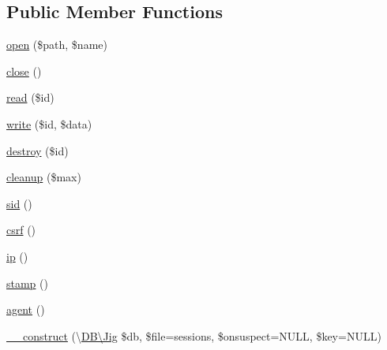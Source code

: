 \subsection*{Public Member Functions}
\begin{DoxyCompactItemize}
\item 
\hyperlink{class_d_b_1_1_jig_1_1_session_a037c59224bcb347b69ca61df88ef7230}{open} (\$path, \$name)
\item 
\hyperlink{class_d_b_1_1_jig_1_1_session_aa69c8bf1f1dcf4e72552efff1fe3e87e}{close} ()
\item 
\hyperlink{class_d_b_1_1_jig_1_1_session_afa59bebedda70c37b94c2efc35da83f3}{read} (\$id)
\item 
\hyperlink{class_d_b_1_1_jig_1_1_session_a5f277b5f0e4e2154cddc9a3a0d2bf57d}{write} (\$id, \$data)
\item 
\hyperlink{class_d_b_1_1_jig_1_1_session_a726fa8a4b4b187b9ca32ba427aac8137}{destroy} (\$id)
\item 
\hyperlink{class_d_b_1_1_jig_1_1_session_a60b027eb0df6d42b8fe2ec8c93cfbbae}{cleanup} (\$max)
\item 
\hyperlink{class_d_b_1_1_jig_1_1_session_a30b416c35150ab6bdde364f527f612bd}{sid} ()
\item 
\hyperlink{class_d_b_1_1_jig_1_1_session_a048d24aa22a28f92f1f3a7e3d323f45e}{csrf} ()
\item 
\hyperlink{class_d_b_1_1_jig_1_1_session_a197bae3714812901860bd006b00f91de}{ip} ()
\item 
\hyperlink{class_d_b_1_1_jig_1_1_session_ab0b8b94527259f4aacdf1fd45411abfe}{stamp} ()
\item 
\hyperlink{class_d_b_1_1_jig_1_1_session_a77f6a261d70e66c7b7273774832482dc}{agent} ()
\item 
\hyperlink{class_d_b_1_1_jig_1_1_session_a7e7d0206d7feb1eb2ff8b121078243bd}{\+\_\+\+\_\+construct} (\textbackslash{}\hyperlink{class_d_b_1_1_jig}{D\+B\textbackslash{}\+Jig} \$db, \$file=\textquotesingle{}sessions\textquotesingle{}, \$onsuspect=N\+U\+LL, \$key=N\+U\+LL)
\end{DoxyCompactItemize}

